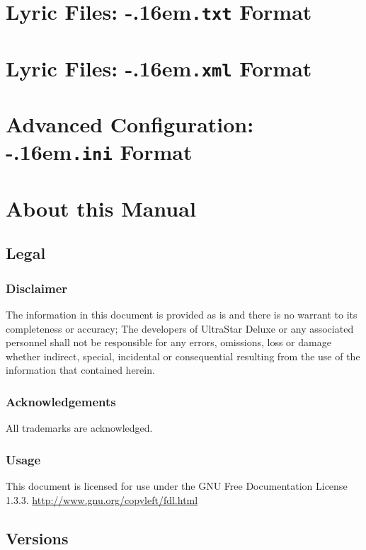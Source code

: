 \documentclass{scrreprt}
\newcommand*\fileending[1]{\texorpdfstring{\kern-.16em\texttt{#1}}{#1}}
\begin{document}
\appendix

\chapter{Lyric Files: \fileending{.txt} Format}

\chapter{Lyric Files: \fileending{.xml} Format}

\chapter{Advanced Configuration: \fileending{.ini} Format}

\chapter{About this Manual}
\section{Legal}
\subsection{Disclaimer}
The information in this document is provided as is
and there is no warrant to its completeness or accuracy;
The developers of UltraStar Deluxe or any associated personnel
shall not be responsible for any errors, omissions, loss or damage
whether indirect, special, incidental or consequential
resulting from the use of the information that contained herein.

\subsection{Acknowledgements}
All trademarks are acknowledged.

\subsection{Usage}
This document is licensed for use
under the GNU Free Documentation License 1.3.3.
\url{http://www.gnu.org/copyleft/fdl.html}

\section{Versions}
\end{document}
